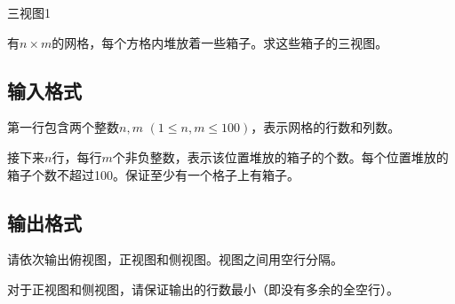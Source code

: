 \begin{Problem}{三视图}{1}

有$n \times m$的网格，每个方格内堆放着一些箱子。求这些箱子的三视图。

\subsection*{输入格式}

第一行包含两个整数$n, m$ $(1 \leq n, m \leq 100)$，表示网格的行数和列数。

接下来$n$行，每行$m$个非负整数，表示该位置堆放的箱子的个数。每个位置堆放的箱子个数不超过100。保证至少有一个格子上有箱子。

\subsection*{输出格式}

请依次输出俯视图，正视图和侧视图。视图之间用空行分隔。

对于正视图和侧视图，请保证输出的行数最小（即没有多余的全空行）。


\end{Problem}
